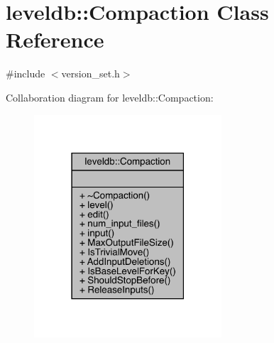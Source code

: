 \hypertarget{classleveldb_1_1_compaction}{}\section{leveldb\+::Compaction Class Reference}
\label{classleveldb_1_1_compaction}


{\ttfamily \#include $<$version\+\_\+set.\+h$>$}



Collaboration diagram for leveldb\+::Compaction\+:
\nopagebreak
\begin{figure}[H]
\begin{center}
\leavevmode
\includegraphics[width=198pt]{classleveldb_1_1_compaction__coll__graph}
\end{center}
\end{figure}
